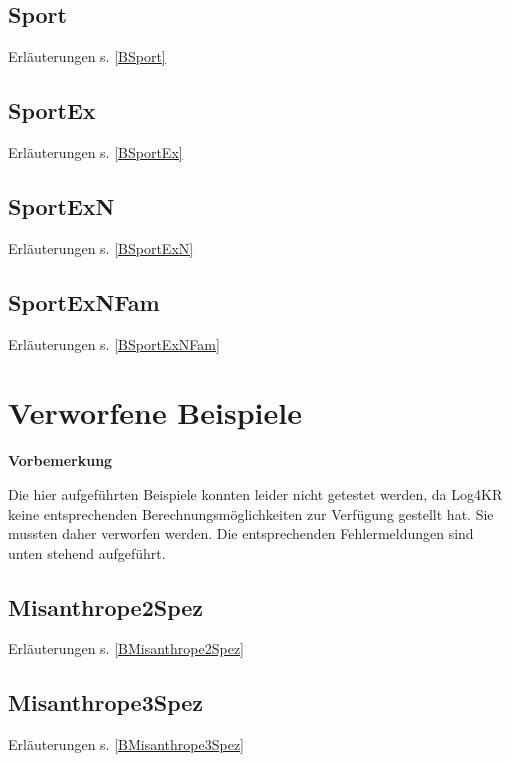 \documentclass[a4paper, 11pt]{book}
\begin{document}
{\newpage

\section{Sport} Erläuterungen s. \ref{BSport}
\label{Sport}

\newpage

\section{SportEx} Erläuterungen s. \ref{BSportEx}
\label{SportEx}

\newpage


\section{SportExN} Erläuterungen s. \ref{BSportExN}
\label{SportExN}



\newpage

\section{SportExNFam} Erläuterungen s. \ref{BSportExNFam}
\label{SportExNFam}



\newpage



\chapter{Verworfene Beispiele}
\label{examplesdep}
\textbf{Vorbemerkung}


\noindent
Die hier aufgeführten Beispiele konnten leider nicht getestet werden, da Log4KR keine entsprechenden Berechnungsmöglichkeiten zur Verfügung gestellt hat. Sie mussten daher verworfen werden. Die entsprechenden Fehlermeldungen sind unten stehend aufgeführt.

\section{Misanthrope2Spez} Erläuterungen s. \ref{BMisanthrope2Spez}
\label{Misanthrope2Spez}


\newpage


\section{Misanthrope3Spez} Erläuterungen s. \ref{BMisanthrope3Spez}
\label{Misanthrope3Spez}



}
\end{document}
